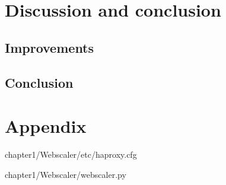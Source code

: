 \section{Discussion and conclusion}
\subsection{Improvements}

\subsection{Conclusion}

\section{Appendix}
\thispagestyle{empty}
\begin{center}

{chapter1/Webscaler/etc/haproxy.cfg}



{chapter1/Webscaler/webscaler.py}







\end{center}
\restoregeometry
